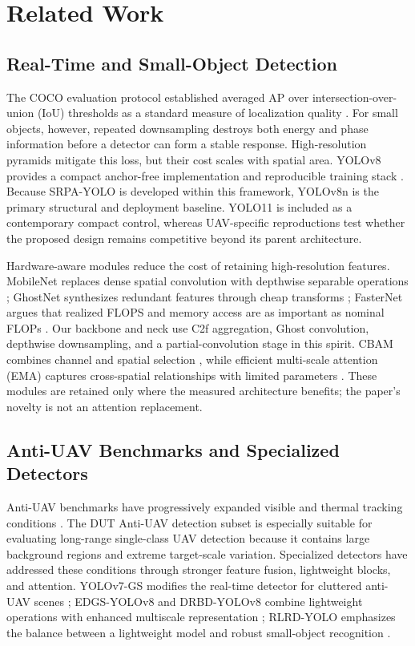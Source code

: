 \section{Related Work}

\subsection{Real-Time and Small-Object Detection}
The COCO evaluation protocol established averaged AP over intersection-over-union (IoU) thresholds as a standard measure of localization quality \cite{lin2014coco}. For small objects, however, repeated downsampling destroys both energy and phase information before a detector can form a stable response. High-resolution pyramids mitigate this loss, but their cost scales with spatial area. YOLOv8 provides a compact anchor-free implementation and reproducible training stack \cite{ultralytics2023}. Because SRPA-YOLO is developed within this framework, YOLOv8n is the primary structural and deployment baseline. YOLO11 is included as a contemporary compact control, whereas UAV-specific reproductions test whether the proposed design remains competitive beyond its parent architecture.

Hardware-aware modules reduce the cost of retaining high-resolution features. MobileNet replaces dense spatial convolution with depthwise separable operations \cite{howard2017mobilenets}; GhostNet synthesizes redundant features through cheap transforms \cite{han2020ghostnet}; FasterNet argues that realized FLOPS and memory access are as important as nominal FLOPs \cite{chen2023fasternet}. Our backbone and neck use C2f aggregation, Ghost convolution, depthwise downsampling, and a partial-convolution stage in this spirit. CBAM combines channel and spatial selection \cite{woo2018cbam}, while efficient multi-scale attention (EMA) captures cross-spatial relationships with limited parameters \cite{ouyang2023ema}. These modules are retained only where the measured architecture benefits; the paper's novelty is not an attention replacement.

\subsection{Anti-UAV Benchmarks and Specialized Detectors}
Anti-UAV benchmarks have progressively expanded visible and thermal tracking conditions \cite{zhao2022antiuav,jiang2023antiuav,huang2024antiuav410}. The DUT Anti-UAV detection subset is especially suitable for evaluating long-range single-class UAV detection because it contains large background regions and extreme target-scale variation. Specialized detectors have addressed these conditions through stronger feature fusion, lightweight blocks, and attention. YOLOv7-GS modifies the real-time detector for cluttered anti-UAV scenes \cite{bo2024yolov7gs}; EDGS-YOLOv8 and DRBD-YOLOv8 combine lightweight operations with enhanced multiscale representation \cite{huang2024edgs,jiang2024drbd}; RLRD-YOLO emphasizes the balance between a lightweight model and robust small-object recognition \cite{li2025rlrd}.

